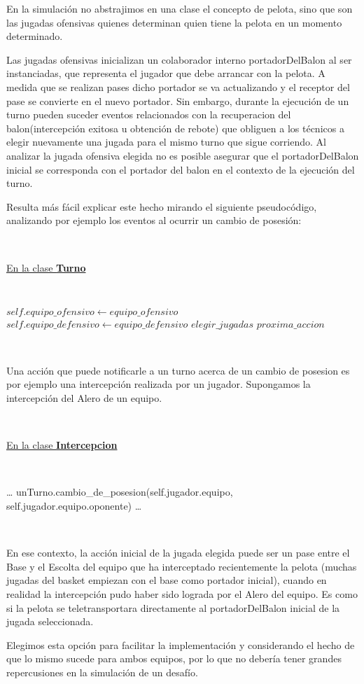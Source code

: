 En la simulación no abstrajimos en una clase el concepto de pelota, sino que son las jugadas ofensivas quienes determinan quien tiene la pelota en un momento determinado.

Las jugadas ofensivas inicializan un colaborador interno portadorDelBalon al ser instanciadas, que representa el jugador que debe arrancar con la pelota.
A medida que se realizan pases dicho portador se va actualizando y el receptor del pase se convierte en el nuevo portador.
Sin embargo, durante la ejecución de un turno pueden suceder eventos relacionados con la recuperacion del balon(intercepción exitosa u obtención de rebote)
que obliguen a los técnicos a elegir nuevamente una jugada para el mismo turno que sigue corriendo. Al analizar la jugada ofensiva
elegida no es posible asegurar que el portadorDelBalon inicial se corresponda con el portador del balon en el contexto de la ejecución del turno. 

Resulta más fácil explicar este hecho mirando el siguiente pseudocódigo, analizando por ejemplo los eventos al ocurrir un cambio de posesión:

~

\underline{En la clase \textbf{Turno}}

~

\begin{algorithmic}
	  \State $self.equipo\_ofensivo\gets equipo\_ofensivo$
	  \State $self.equipo\_defensivo\gets equipo\_defensivo$
	  \State $elegir\_jugadas$
	  \State $proxima\_accion$
	\EndFunction
\end{algorithmic}

~ 

Una acción que puede notificarle a un turno acerca de un cambio de posesion es por ejemplo una intercepción realizada por un jugador. Supongamos la intercepción del Alero de un equipo.

~

\underline{En la clase \textbf{Intercepcion}}

~

\begin{algorithmic}
	  \State \ldots
	  \State unTurno.cambio\_de\_posesion(self.jugador.equipo, self.jugador.equipo.oponente)
	  \State \ldots
	\EndFunction
\end{algorithmic}

~

En ese contexto, la acción inicial de la jugada elegida puede ser un pase entre el Base y el Escolta del equipo que ha interceptado recientemente la pelota (muchas jugadas
del basket empiezan con el base como portador inicial), cuando en realidad la intercepción pudo haber sido lograda por el Alero del equipo. Es como si la pelota se teletransportara
directamente al portadorDelBalon inicial de la jugada seleccionada.

Elegimos esta opción para facilitar la implementación y considerando el hecho de que lo mismo sucede para ambos equipos, por lo que no debería tener grandes repercusiones en la 
simulación de un desafío.

